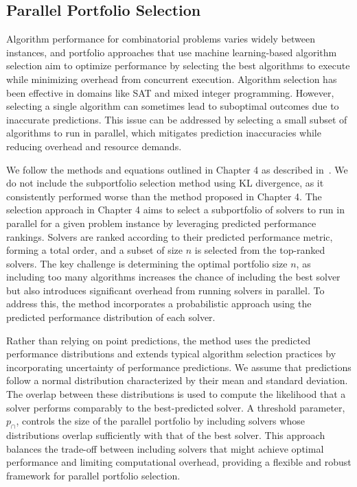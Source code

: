 \subsection{Parallel Portfolio Selection}
Algorithm performance for combinatorial problems varies widely between instances, and portfolio approaches that use machine learning-based algorithm selection aim to optimize performance by selecting the best algorithms to execute while minimizing overhead from concurrent execution. Algorithm selection has been effective in domains like SAT and mixed integer programming. However, selecting a single algorithm can sometimes lead to suboptimal outcomes due to inaccurate predictions. This issue can be addressed by selecting a small subset of algorithms to run in parallel, which mitigates prediction inaccuracies while reducing overhead and resource demands.

We follow the methods and equations outlined in Chapter 4 as described in~\cite{kashgarani2023automatic}. We do not include the subportfolio selection method using KL divergence, as it consistently performed worse than the method proposed in Chapter 4. The selection approach in Chapter 4 aims to select a subportfolio of solvers to run in parallel for a given problem instance by leveraging predicted performance rankings. Solvers are ranked according to their predicted performance metric, forming a total order, and a subset of size $n$ is selected from the top-ranked solvers. The key challenge is determining the optimal portfolio size $n$, as including too many algorithms increases the chance of including the best solver but also introduces significant overhead from running solvers in parallel. To address this, the method incorporates a probabilistic approach using the predicted performance distribution of each solver.

Rather than relying on point predictions, the method uses the predicted performance distributions and extends typical algorithm selection practices by incorporating uncertainty of performance predictions. We assume that predictions follow a normal distribution characterized by their mean and standard deviation. The overlap between these distributions is used to compute the likelihood that a solver performs comparably to the best-predicted solver. A threshold parameter, $p_{\cap}$, controls the size of the parallel portfolio by including solvers whose distributions overlap sufficiently with that of the best solver. This approach balances the trade-off between including solvers that might achieve optimal performance and limiting computational overhead, providing a flexible and robust framework for parallel portfolio selection. 

